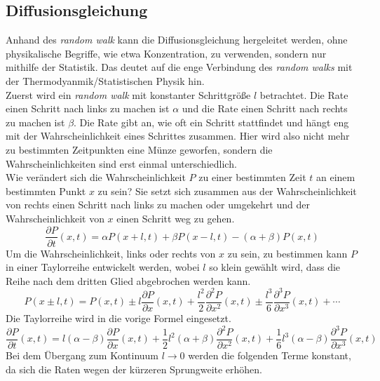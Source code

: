 \subsection*{Diffusionsgleichung}
Anhand des \emph{random walk} kann die Diffusionsgleichung hergeleitet werden, ohne physikalische Begriffe, wie etwa Konzentration, zu verwenden, sondern nur mithilfe der Statistik. Das deutet auf die enge Verbindung des \emph{random walks} mit der Thermodyanmik/Statistischen Physik hin.\\
Zuerst wird ein \emph{random walk} mit konstanter Schrittgröße $l$ betrachtet. Die Rate einen Schritt nach links zu machen ist $\alpha$ und die Rate einen Schritt nach rechts zu machen ist $\beta$. Die Rate gibt an, wie oft ein Schritt stattfindet und hängt eng mit der Wahrscheinlichkeit eines Schrittes zusammen. Hier wird also nicht mehr zu bestimmten Zeitpunkten eine Münze geworfen, sondern die Wahrscheinlichkeiten sind erst einmal unterschiedlich.\\ Wie verändert sich die Wahrscheinlichkeit $P$ zu einer bestimmten Zeit $t$ an einem bestimmten Punkt $x$ zu sein? Sie setzt sich zusammen aus der Wahrscheinlichkeit von rechts einen Schritt nach links zu machen oder umgekehrt und der Wahrscheinlichkeit von $x$ einen Schritt weg zu gehen.
\begin{equation}
  \frac{\partial P}{\partial t} (x, t) = \alpha P(x + l, t) + \beta P(x - l, t) - (\alpha + \beta) P(x, t)
\end{equation}
Um die Wahrscheinlichkeit, links oder rechts von $x$ zu sein, zu bestimmen kann $P$ in einer Taylorreihe entwickelt werden, wobei $l$ so klein gewählt wird, dass die Reihe nach dem dritten Glied abgebrochen werden kann.
\begin{equation}
  P(x \pm l, t) = P(x, t) \pm l \frac{\partial P}{\partial x}(x, t) + \frac{l^2}{2} \frac{\partial^2 P}{\partial x^2}(x, t) \pm \frac{l^3}{6} \frac{\partial^3 P}{\partial x^3}(x, t) + \cdots
\end{equation}
Die Taylorreihe wird in die vorige Formel eingesetzt.
\begin{equation}
  \frac{\partial P}{\partial t} (x, t) = l (\alpha - \beta) \frac{\partial P}{\partial x}(x, t) + \frac{1}{2} l^2 (\alpha + \beta) \frac{\partial^2 P}{\partial x^2}(x, t) + \frac{1}{6} l^3 (\alpha - \beta) \frac{\partial^3 P}{\partial x^3}(x, t)
\end{equation}
Bei dem Übergang zum Kontinuum $l \to 0$ werden die folgenden Terme konstant, da sich die Raten wegen der kürzeren Sprungweite erhöhen.
